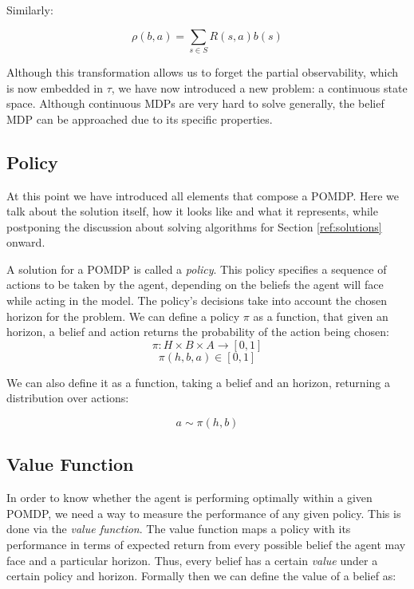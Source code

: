 Similarly:

\[ \rho(b,a) = \sum_{s\in S} R(s,a) b(s) \]

Although this transformation allows us to forget the partial observability, which is now embedded in
$\tau$, we have now introduced a new problem: a continuous state space. Although continuous MDPs are
very hard to solve generally, the belief MDP can be approached due to its specific properties.

\subsection{Policy}

At this point we have introduced all elements that compose a POMDP. Here we talk about the solution
itself, how it looks like and what it represents, while postponing the discussion about solving
algorithms for Section \ref{ref:solutions} onward.

A solution for a POMDP is called a \textit{policy}. This policy specifies a sequence of actions to
be taken by the agent, depending on the beliefs the agent will face while acting in the model. The
policy's decisions take into account the chosen horizon for the problem. We can define a policy
$\pi$ as a function, that given an horizon, a belief and action returns the probability of the action
being chosen:
\[ \pi : H \times B \times A \rightarrow [0,1] \]
\[ \pi(h, b, a) \in [0,1] \]

We can also define it as a function, taking a belief and an horizon, returning a distribution over
actions:

\[ a \sim \pi(h, b) \]

\subsection{Value Function}

In order to know whether the agent is performing optimally within a given POMDP, we need a way to measure
the performance of any given policy. This is done via the \textit{value function}.
The value function maps a policy with its performance in terms of expected return from every
possible belief the agent may face and a particular horizon. Thus, every belief has a certain
\textit{value} under a certain policy and horizon. Formally then we can define the value of a belief
as:


